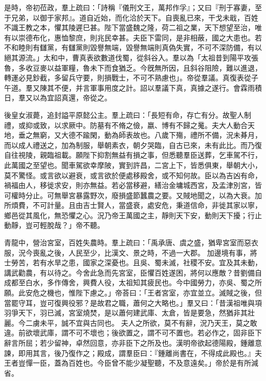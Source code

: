 \begin{pinyinscope}
 
 
 
 是時，帝初莅政，羣上疏曰：「詩稱『儀刑文王，萬邦作孚』；又曰『刑于寡妻，至于兄弟，以御于家邦』。道自近始，而化洽於天下。自喪亂已來，干戈未戢，百姓不識王教之本，懼其陵遲巳甚。陛下當盛魏之隆，荷二祖之業，天下想望至治，唯有以崇德布化，惠恤黎庶，則兆民幸甚。夫臣下雷同，是非相蔽，國之大患也。若不和睦則有讎黨，有讎黨則毀譽無端，毀譽無端則真偽失實，不可不深防備，有以絕其源流。」太和中，曹真表欲數道伐蜀，從斜谷入。羣以為「太祖昔到陽平攻張魯，多收豆麥以益軍糧，魯未下而食猶乏。今旣無所因，且斜谷阻險，難以進退，轉運必見鈔截，多留兵守要，則損戰士，不可不熟慮也」。帝從羣議。真復表從子午道。羣又陳其不便，并言軍事用度之計。詔以羣議下真，真據之遂行。會霖雨積日，羣又以為宜詔真還，帝從之。
 
 
 
 
 後皇女淑薨，追封謚平原懿公主。羣上疏曰：「長短有命，存亡有分。故聖人制禮，或抑或致，以求厥中。防墓有不脩之儉，嬴、博有不歸之䰟。夫大人動合天地，垂之無窮，又大德不踰閑，動為師表故也。八歲下殤，禮所不備，況未朞月，而以成人禮送之，加為制服，舉朝素衣，朝夕哭臨，自古已來，未有此比。而乃復自往視陵，親臨祖載。願陛下抑割無益有損之事，但悉聽羣臣送葬，乞車駕不行，此萬國之至望也。聞車駕欲幸摩陂，實到許昌，二宮上下，皆悉俱東，舉朝大小，莫不驚怪。或言欲以避衰，或言欲於便處移殿舍，或不知何故。臣以為吉凶有命，禍福由人，移徙求安，則亦無益。若必當移避，繕治金墉城西宮，及孟津別宮，皆可權時分止。可無舉宮暴露野次，廢損盛節蠶農之要。又賊地聞之，以為大衰。加所煩費，不可計量。且由吉士賢人，當盛衰，處安危，秉道信命，非徙其家以寧，鄉邑從其風化，無恐懼之心。況乃帝王萬國之主，靜則天下安，動則天下擾；行止動靜，豈可輕脫哉？」帝不聽。
 
 
青龍中，營治宮室，百姓失農時。羣上疏曰：「禹承唐、虞之盛，猶卑宮室而惡衣服，況今喪亂之後，人民至少，比漢文、景之時，不過一大郡。
 加邊境有事，將士勞苦，若有水旱之患，國家之深憂也。且吳、蜀未滅，社稷不安。宜及其未動，講武勸農，有以待之。今舍此急而先宮室，臣懼百姓遂困，將何以應敵？昔劉備自成都至白水，多作傳舍，興費人役，太祖知其疲民也。今中國勞力，亦吳、蜀之所願。此安危之機也，惟陛下慮之。」帝荅曰：「王者宮室，亦宜並立。滅賊之後，但當罷守耳，豈可復興役邪？是故君之職，蕭何之大略也。」羣又曰：「昔漢祖唯與項羽爭天下，羽已滅，宮室燒焚，是以蕭何建武庫、太倉，皆是要急，然猶非其壯麗。今二虜未平，誠不宜與古同也。
 夫人之所欲，莫不有辭，況乃天王，莫之敢違。前欲壞武庫，謂不可不壞也；後欲置之，謂不可不置也。若必作之，固非臣下辭言所屈；若少留神，卓然回意，亦非臣下之所及也。漢明帝欲起德陽殿，鍾離意諫，即用其言，後乃復作之；殿成，謂羣臣曰：『鍾離尚書在，不得成此殿也。』夫王者豈憚一臣，蓋為百姓也。今臣曾不能少凝聖聽，不及意遠矣。」帝於是有所減省。
 

\end{pinyinscope}
